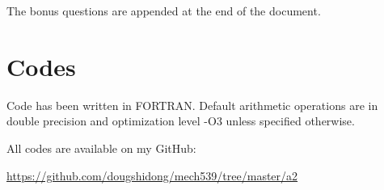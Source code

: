 \documentclass[letterpaper,12pt,]{article}
\begin{document}
The bonus questions are appended at the end of the document.

\section*{Codes}

Code has been written in FORTRAN. Default arithmetic operations are in double precision and optimization level -O3 unless specified otherwise.

All codes are available on my GitHub:

\url{https://github.com/dougshidong/mech539/tree/master/a2}



\end{document}
